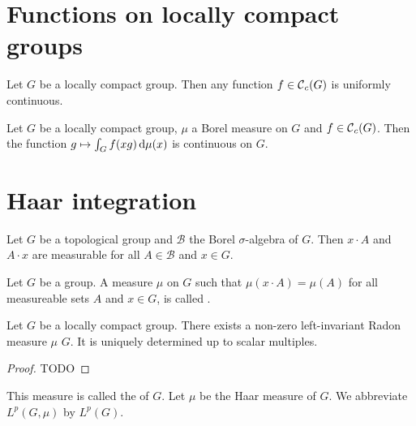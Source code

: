 \section{Functions on locally compact groups}

\begin{proposition}
Let $G$ be a locally compact group. Then any function $f\in \operatorname{\mathcal{C}}_c(G)$ is uniformly continuous.
\end{proposition}

\begin{proposition} \label{integralCompactSupportContinuous}
Let $G$ be a locally compact group, $\mu$ a Borel measure on $G$ and $f\in \operatorname{\mathcal{C}}_c(G)$.
Then the function $g\mapsto \int_G f(xg)\operatorname{d \!}{\mu(x)}$ is continuous on $G$.
\end{proposition}

\section{Haar integration}

\begin{lemma}
Let $G$ be a topological group and $\mathcal{B}$ the Borel $\sigma$-algebra of $G$. Then $x\cdot A$ and $A\cdot x$ are measurable for all $A\in \mathcal{B}$ and $x\in G$.
\end{lemma}

\begin{definition}
Let $G$ be a group. A measure $\mu$ on $G$ such that $\mu(x\cdot A) = \mu(A)$ for all measureable sets $A$ and $x\in G$,
is called .
\end{definition}

\begin{theorem}
Let $G$ be a locally compact group. There exists a non-zero left-invariant Radon measure $\mu$ $G$.
It is uniquely determined up to scalar multiples.
\end{theorem}
\begin{proof}
TODO
\end{proof}

\begin{definition}
This measure is called the  of $G$. Let $\mu$ be the Haar measure of $G$. We abbreviate $L^p(G,\mu)$ by $L^p(G)$.
\end{definition}


